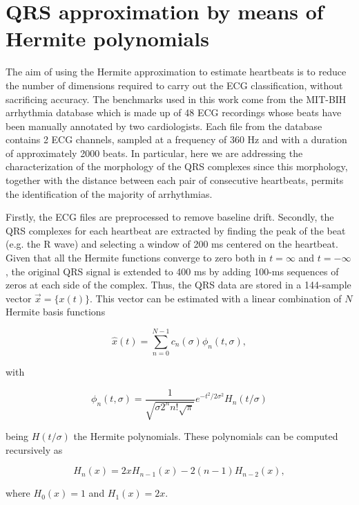 \documentclass[runningheads]{llncs}
\begin{document}
\section{QRS approximation by means of Hermite polynomials}\label{s:arr}

The aim of using the Hermite approximation to estimate heartbeats is to 
reduce the number of dimensions required to carry out the ECG classification, 
without sacrificing accuracy. 
The benchmarks used in this work come from the MIT-BIH arrhythmia database \cite{j:moody01} which is made up of 
48 ECG recordings whose beats  have been manually annotated by two cardiologists. Each file from the database 
contains 2 ECG channels, sampled at a frequency of 360 Hz and with a duration of approximately 2000 beats. 
In particular, here we are addressing the characterization of the morphology of the QRS complexes since this 
morphology, together with the distance between each pair of consecutive heartbeats, permits the identification of the majority of arrhythmias.

Firstly,  the ECG files are preprocessed to remove baseline drift. Secondly, the QRS complexes for each heartbeat are extracted by finding the peak of the beat (e.g. the R wave) and selecting a  window of 200 ms centered on the heartbeat. Given that all the Hermite functions converge to zero both in $t=\infty$ and $t=-\infty$, the original QRS signal is extended to 400 ms by adding 100-ms sequences of zeros at each side of the complex. Thus, the QRS data are stored in a 144-sample vector $\vec{x}=\{x(t)\}$. This vector can be estimated with a linear combination of $N$ Hermite basis functions

\begin{equation}\label{eqn:hat}
\hat{x}(t)=\sum_{n=0}^{N-1}c_n(\sigma )\phi_n(t,\sigma),
\end{equation}

\noindent with

\begin{equation}\label{eqn:phi}
\phi_n(t,\sigma )=\frac{1}{\sqrt{\sigma 2^n n!\sqrt{\pi}}}e^{-t^2/2\sigma^2}H_n(t/\sigma) 
\end{equation}

\noindent being $H(t/\sigma)$ the Hermite polynomials. These polynomials can be computed recursively as

\begin{equation}
H_n(x)=2xH_{n-1}(x)-2(n-1)H_{n-2}(x),
\end{equation}

\noindent where $H_0(x)=1$ and $H_1(x)=2x$.
\end{document}
